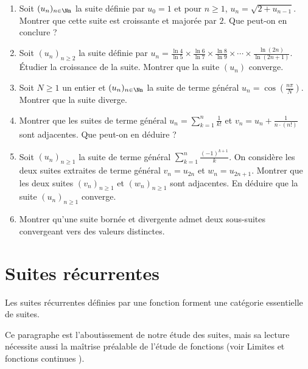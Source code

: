 \documentclass[class=report,crop=false]{standalone}
\begin{document}
\begin{miniexercices}
\sauteligne
\begin{enumerate}
  \item Soit $(u_n)_{n\in \Nn}$ la suite définie par $u_0=1$ et pour $n\geq 1$,
$u_n=\sqrt{2+u_{n-1}}$. Montrer que cette suite est croissante et majorée par $2$.
Que peut-on en conclure ?

  \item Soit $(u_n)_{n \ge 2}$ la suite définie par
  $u_n =\frac{\ln 4}{\ln 5}\times \frac{\ln 6}{\ln 7}\times\frac{\ln 8}{\ln 9}\times
  \cdots \times\frac{\ln (2n)}{\ln (2n+1)}.$  \'Etudier la croissance de la suite.
  Montrer que la suite $(u_n)$ converge.

  \item Soit $N\geq 1$ un entier et $(u_n)_{n\in \Nn}$ la suite de terme général
$u_n=\cos(\frac{n\pi}{N})$. Montrer que la suite diverge.

  \item Montrer que les suites de terme général $u_n=\sum_{k=1}^n \frac{1}{k!}$ et
$v_n=u_n+\frac{1}{n \cdot (n!)}$ sont adjacentes. Que peut-on en déduire ?

   \item Soit $(u_n)_{n\geq 1}$ la suite de terme général $\sum_{k=1}^{n}\frac{(-1)^{k+1}}{k}$.
On considère les deux suites extraites de terme général $v_n=u_{2n}$ et $w_n= u_{2n+1}$.
Montrer que les deux suites $(v_n)_{n\geq 1}$ et $(w_n)_{n\geq 1}$ sont adjacentes.
En déduire que la suite $(u_n)_{n\geq 1}$ converge.

   \item Montrer qu'une suite bornée et divergente admet deux sous-suites convergeant
   vers des valeurs distinctes.
\end{enumerate}
\end{miniexercices}


\section{Suites récurrentes}

Les suites récurrentes définies par une fonction forment une catégorie essentielle de suites.


Ce 
paragraphe est l'aboutissement de notre étude %
des suites, mais sa lecture nécessite aussi la maîtrise préalable de l'étude de fonctions (voir \og Limites et fonctions continues \fg).
\end{document}
